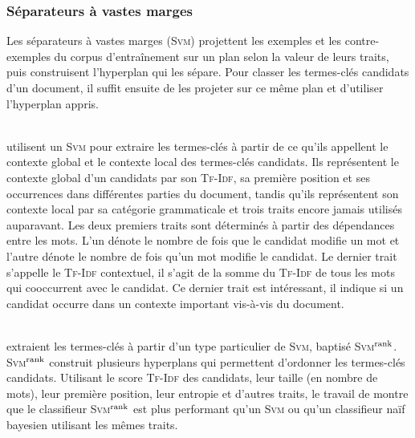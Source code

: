       \subsubsection{Séparateurs à vastes marges}
      \label{subsubsec:main-state_of_the_art-automatic_keyphrase_extraction-supervised_keyphrase_extraction-svms}
        Les séparateurs à vastes marges (\textsc{Svm}) projettent les exemples
        et les contre-exemples du corpus d'entraînement sur un plan selon la
        valeur de leurs traits, puis construisent l'hyperplan qui les sépare.
        Pour classer les termes-clés candidats d'un document, il suffit ensuite
        de les projeter sur ce même plan et d'utiliser l'hyperplan appris.

        ~\\ utilisent un \textsc{Svm} pour extraire les
        termes-clés à partir de ce qu'ils appellent le contexte global et le
        contexte local des termes-clés candidats. Ils représentent le contexte
        global d'un candidats par son \textsc{Tf-Idf}, sa première position et
        ses occurrences dans différentes parties du document, tandis qu'ils
        représentent son contexte local par sa catégorie grammaticale et trois
        traits encore jamais utilisés auparavant. Les deux premiers traits sont
        déterminés à partir des dépendances entre les mots.
        L'un dénote le nombre de fois que le candidat modifie un mot
        et l'autre dénote le nombre de fois qu'un mot modifie le candidat. Le
        dernier trait s'appelle le \textsc{Tf-Idf} contextuel, il s'agit de la
        somme du \textsc{Tf-Idf} de tous les mots qui cooccurrent avec le
        candidat. Ce dernier trait est intéressant, il indique si un candidat occurre dans un
        contexte important vis-à-vis du document.

        ~\\ extraient les termes-clés à partir d'un
        type particulier de \textsc{Svm}, baptisé
        \textsc{Svm}$^\textnormal{rank}$. \textsc{Svm}$^\textnormal{rank}$
        construit plusieurs hyperplans qui permettent d'ordonner les termes-clés
        candidats. Utilisant le score \textsc{Tf-Idf} des candidats, leur taille
        (en nombre de mots), leur première position, leur entropie et d'autres
        traits, le travail de  montre que le
        classifieur \textsc{Svm}$^\textnormal{rank}$ est plus performant qu'un
        \textsc{Svm} ou qu'un classifieur naïf bayesien utilisant les mêmes
        traits.

